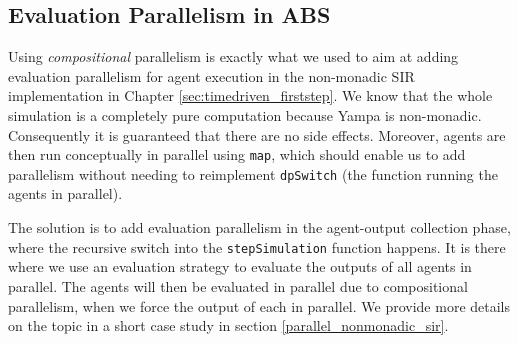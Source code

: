 \subsection{Evaluation Parallelism in ABS}
Using \textit{compositional} parallelism is exactly what we used to aim at adding evaluation parallelism for agent execution in the non-monadic SIR implementation in Chapter \ref{sec:timedriven_firststep}. We know that the whole simulation is a completely pure computation because Yampa is non-monadic. Consequently it is guaranteed that there are no side effects. Moreover, agents are then run conceptually in parallel using \texttt{map}, which should enable us to add parallelism without needing to reimplement \texttt{dpSwitch} (the function running the agents in parallel). %

The solution is to add evaluation parallelism in the agent-output collection phase, where the recursive switch into the \texttt{stepSimulation} function happens. It is there where we use an evaluation strategy to evaluate the outputs of all agents in parallel. The agents will then be evaluated in parallel due to compositional parallelism, when we force the output of each in parallel. We provide more details on the topic in a short case study in section \ref{parallel_nonmonadic_sir}.